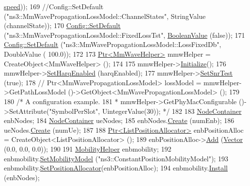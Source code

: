 \begin{DoxyCode}
      \hyperlink{mmwave-amc-test_8cc_a6dc6e6f3c75c509ce943163afb5dade7}{speed}));
169         \textcolor{comment}{//Config::SetDefault ("ns3::MmWavePropagationLossModel::ChannelStates", StringValue
       (channelState));}
170         \hyperlink{group__config_ga2e7882df849d8ba4aaad31c934c40c06}{Config::SetDefault} (\textcolor{stringliteral}{"ns3::MmWavePropagationLossModel::FixedLossTst"}, 
      \hyperlink{classns3_1_1BooleanValue}{BooleanValue} (\textcolor{keyword}{false}));
171         \hyperlink{group__config_ga2e7882df849d8ba4aaad31c934c40c06}{Config::SetDefault} (\textcolor{stringliteral}{"ns3::MmWavePropagationLossModel::LossFixedDb"}, DoubleValue (
      100.0));
172 
173   \hyperlink{classns3_1_1Ptr}{Ptr<MmWaveHelper>} mmwHelper = CreateObject<MmWaveHelper> ();
174 
175   mmwHelper->\hyperlink{classns3_1_1Object_af4411cb29971772fcd09203474a95078}{Initialize}();
176   mmwHelper->\hyperlink{classns3_1_1MmWaveHelper_af211a02952ab5f4eabe0219cf53e7e1c}{SetHarqEnabled} (harqEnabled);
177   mmwHelper->\hyperlink{classns3_1_1MmWaveHelper_ac25fffd187a813ecbf1922adcf050001}{SetSnrTest} (\textcolor{keyword}{true});
178  \textcolor{comment}{// Ptr<MmWavePropagationLossModel> lossModel = mmwHelper->GetPathLossModel
       ()->GetObject<MmWavePropagationLossModel> ();}
179 
180   \textcolor{comment}{/* A configuration example.}
181 \textcolor{comment}{   * mmwHelper->GetPhyMacConfigurable ()->SetAttribute("SymbolPerSlot", UintegerValue(30)); */}
182 
183   \hyperlink{classns3_1_1NodeContainer}{NodeContainer} enbNodes;
184   \hyperlink{classns3_1_1NodeContainer}{NodeContainer} ueNodes;
185   enbNodes.\hyperlink{classns3_1_1NodeContainer_a787f059e2813e8b951cc6914d11dfe69}{Create} (numEnb);
186   ueNodes.\hyperlink{classns3_1_1NodeContainer_a787f059e2813e8b951cc6914d11dfe69}{Create} (numUe);
187 
188   \hyperlink{classns3_1_1Ptr}{Ptr<ListPositionAllocator>} enbPositionAlloc = 
      CreateObject<ListPositionAllocator> ();
189   enbPositionAlloc->\hyperlink{classns3_1_1ListPositionAllocator_a460e82f015ac012a73ba0ea0cccb3486}{Add} (\hyperlink{classns3_1_1Vector3D_a7e59b47bc94c9cb1dadff68c1d0112d8}{Vector} (0.0, 0.0, 0.0));
190 
191   \hyperlink{classns3_1_1MobilityHelper}{MobilityHelper} enbmobility;
192   enbmobility.\hyperlink{classns3_1_1MobilityHelper_a030275011b6f40682e70534d30280aba}{SetMobilityModel} (\textcolor{stringliteral}{"ns3::ConstantPositionMobilityModel"});
193   enbmobility.\hyperlink{classns3_1_1MobilityHelper_ac59d5295076be3cc11021566713a28c5}{SetPositionAllocator}(enbPositionAlloc);
194   enbmobility.\hyperlink{classns3_1_1MobilityHelper_a07737960ee95c0777109cf2994dd97ae}{Install} (enbNodes);

\end{DoxyCode}
